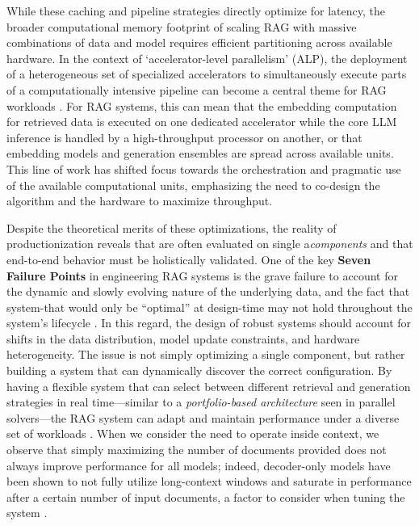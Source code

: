 \documentclass[11pt]{article}
\begin{document}
While these caching and pipeline strategies directly optimize for latency, the broader computational memory footprint of scaling RAG with massive combinations of data and model requires efficient partitioning across available hardware. In the context of `accelerator-level parallelism' (ALP), the deployment of a heterogeneous set of specialized accelerators to simultaneously execute parts of a computationally intensive pipeline can become a central theme for RAG workloads \cite{ref61}. For RAG systems, this can mean that the embedding computation for retrieved data is executed on one dedicated accelerator while the core LLM inference is handled by a high-throughput processor on another, or that embedding models and generation ensembles are spread across available units. This line of work has shifted focus towards the orchestration and pragmatic use of the available computational units, emphasizing the need to co-design the algorithm and the hardware to maximize throughput.

Despite the theoretical merits of these optimizations, the reality of productionization reveals that are often evaluated on single a\emph{components} and that end-to-end behavior must be holistically validated. One of the key \textbf{Seven Failure Points} in engineering RAG systems is the grave failure to account for the dynamic and slowly evolving nature of the underlying data, and the fact that system-that would only be ``optimal'' at design-time may not hold throughout the system's lifecycle \cite{ref59}. In this regard, the design of robust systems should account for shifts in the data distribution, model update constraints, and hardware heterogeneity. The issue is not simply optimizing a single component, but rather building a system that can dynamically discover the correct configuration. By having a flexible system that can select between different retrieval and generation strategies in real time---similar to a \emph{portfolio-based architecture} seen in parallel solvers---the RAG system can adapt and maintain performance under a diverse set of workloads \cite{ref62}. When we consider the need to operate inside context, we observe that simply maximizing the number of documents provided does not always improve performance for all models; indeed, decoder-only models have been shown to not fully utilize long-context windows and saturate in performance after a certain number of input documents, a factor to consider when tuning the system \cite{ref7}.
\end{document}
